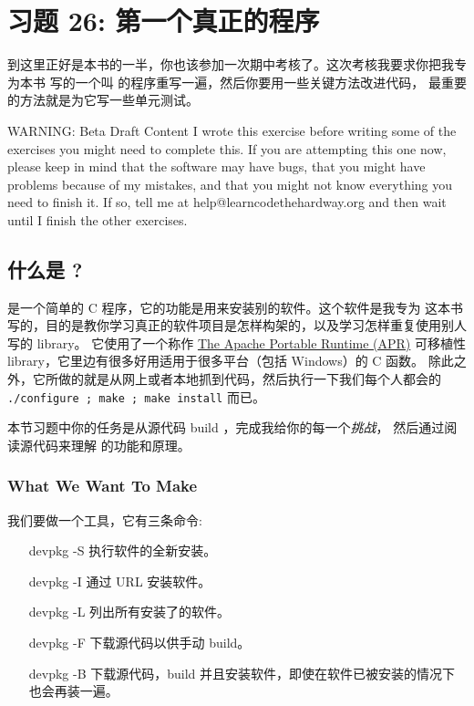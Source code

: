 \chapter{习题 26: 第一个真正的程序}

到这里正好是本书的一半，你也该参加一次期中考核了。这次考核我要求你把我专为本书
写的一个叫  的程序重写一遍，然后你要用一些关键方法改进代码，
最重要的方法就是为它写一些单元测试。

\begin{aside}{WARNING: Beta Draft Content}
I wrote this exercise before writing some of the exercises you might
need to complete this.  If you are attempting this one now, please
keep in mind that the software may have bugs, that you might have
problems because of my mistakes, and that you might not know everything
you need to finish it.  If so, tell me at help@learncodethehardway.org
and then wait until I finish the other exercises.
\end{aside}

\section{什么是 ?}

 是一个简单的 C 程序，它的功能是用来安装别的软件。这个软件是我专为
这本书写的，目的是教你学习真正的软件项目是怎样构架的，以及学习怎样重复使用别人写的 library。
它使用了一个称作 \href{http://apr.apache.org/}{The Apache Portable
Runtime (APR)} 可移植性 library，它里边有很多好用适用于很多平台（包括 Windows）的 C 函数。
除此之外，它所做的就是从网上或者本地抓到代码，然后执行一下我们每个人都会的 
\verb|./configure ; make ; make install| 而已。

本节习题中你的任务是从源代码 build ，完成我给你的每一个\emph{挑战}，
然后通过阅读源代码来理解  的功能和原理。

\subsection{What We Want To Make}

我们要做一个工具，它有三条命令:

\begin{enumerate}
\item[devpkg -S] 执行软件的全新安装。
\item[devpkg -I] 通过 URL 安装软件。
\item[devpkg -L] 列出所有安装了的软件。
\item[devpkg -F] 下载源代码以供手动 build。
\item[devpkg -B] 下载源代码，build 并且安装软件，即使在软件已被安装的情况下也会再装一遍。
\end{enumerate}

